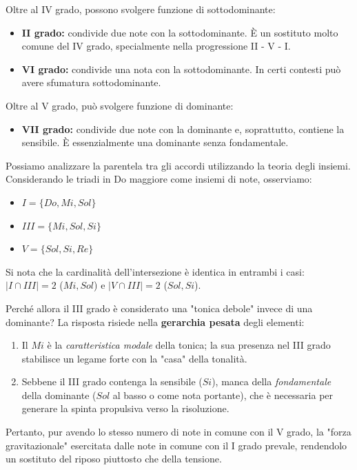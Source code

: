 \begin{definizione}
	\label{def:accordi_sottodominante}
	Oltre al IV grado, possono svolgere funzione di sottodominante:
	\begin{itemize}
		\item \textbf{II grado:} condivide due note con la sottodominante. È un sostituto molto comune del IV grado, specialmente nella progressione II - V - I.
		\item \textbf{VI grado:} condivide una nota con la sottodominante. In certi contesti può avere sfumatura sottodominante.
	\end{itemize}
\end{definizione}


\begin{definizione}
	\label{def:accordi_dominante}
	Oltre al V grado, può svolgere funzione di dominante:
	\begin{itemize}
		\item \textbf{VII grado:} condivide due note con la dominante e, soprattutto, contiene la sensibile. È essenzialmente una dominante senza fondamentale.
	\end{itemize}
\end{definizione}

\begin{matematica}
	Possiamo analizzare la parentela tra gli accordi utilizzando la teoria degli insiemi. Considerando le triadi in Do maggiore come insiemi di note, osserviamo:
	\begin{itemize}
		\item $I = \{Do, Mi, Sol\}$
		\item $III = \{Mi, Sol, Si\}$
		\item $V = \{Sol, Si, Re\}$
	\end{itemize}
	Si nota che la cardinalità dell'intersezione è identica in entrambi i casi: 
	$|I \cap III| = 2$ ($Mi, Sol$) e $|V \cap III| = 2$ ($Sol, Si$). 
	
	Perché allora il III grado è considerato una "tonica debole"  invece di una dominante? La risposta risiede nella \textbf{gerarchia pesata} degli elementi:
	\begin{enumerate}
		\item Il $Mi$ è la \textit{caratteristica modale} della tonica; la sua presenza nel III grado stabilisce un legame forte con la "casa" della tonalità.
		\item Sebbene il III grado contenga la sensibile ($Si$), manca della \textit{fondamentale} della dominante ($Sol$ al basso o come nota portante), che è necessaria per generare la spinta propulsiva verso la risoluzione.
	\end{enumerate}
	Pertanto, pur avendo lo stesso numero di note in comune con il V grado, la "forza gravitazionale" esercitata dalle note in comune con il I grado prevale, rendendolo un sostituto del riposo piuttosto che della tensione.
\end{matematica}


